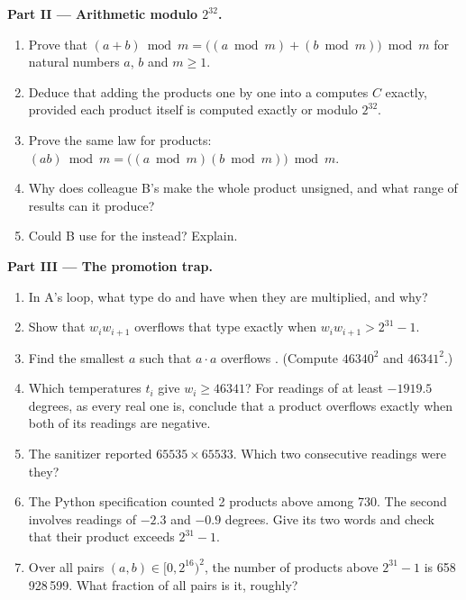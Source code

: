 \begin{problem}
\medskip\noindent\textbf{Part II --- Arithmetic modulo $2^{32}$.}
\begin{enumerate}[resume]
\item Prove that $(a + b) \bmod m = \bigl((a \bmod m) + (b \bmod m)\bigr) \bmod m$ for natural numbers $a$, $b$ and
$m \geq 1$.
\item Deduce that adding the products one by one into a  computes $C$ exactly, provided each product
itself is computed exactly or modulo $2^{32}$.
\item Prove the same law for products: $(ab) \bmod m = \bigl((a \bmod m)(b \bmod m)\bigr) \bmod m$.
\item Why does colleague B's   make the whole product unsigned, and what range of results can
it produce?
\item Could B use  for the  instead? Explain.
\end{enumerate}

\medskip\noindent\textbf{Part III --- The promotion trap.}
\begin{enumerate}[resume]
\item In A's loop, what type do  and  have when they are multiplied, and why?
\item Show that $w_i w_{i+1}$ overflows that type exactly when $w_i w_{i+1} > 2^{31} - 1$.
\item Find the smallest $a$ such that $a \cdot a$ overflows . (Compute $46340^2$ and $46341^2$.)
\item Which temperatures $t_i$ give $w_i \geq 46341$? For readings of at least $-1919.5$ degrees, as every real
one is, conclude that a product overflows exactly when both of its readings are negative.
\item The sanitizer reported $65535 \times 65533$. Which two consecutive readings were they?
\item The Python specification counted 2 products above  among 730. The second involves readings of
$-2.3$ and $-0.9$ degrees. Give its two words and check that their product exceeds $2^{31} - 1$.
\item Over all pairs $(a, b) \in [0, 2^{16})^2$, the number of products above $2^{31}-1$ is 658\,928\,599. What
fraction of all pairs is it, roughly?
\end{enumerate}


\end{problem}

